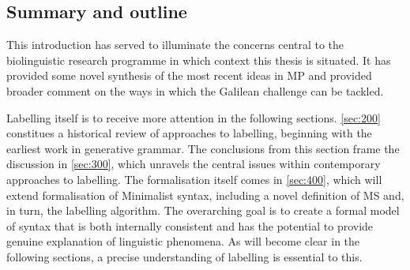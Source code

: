 \subsection{Summary and outline}\label{sec:160}

This introduction has served to illuminate the concerns central to the biolinguistic research programme in which context this thesis is situated. It has provided some novel synthesis of the most recent ideas in MP and provided broader comment on the ways in which the Galilean challenge can be tackled.

Labelling itself is to receive more attention in the following sections. \autoref{sec:200} constitues a historical review of approaches to labelling, beginning with the earliest work in generative grammar. The conclusions from this section frame the discussion in \autoref{sec:300}, which unravels the central issues within contemporary approaches to labelling. The formalisation itself comes in \autoref{sec:400}, which will extend  formalisation of Minimalist syntax, including a novel definition of MS and, in turn, the labelling algorithm. The overarching goal is to create a formal model of syntax that is both internally consistent and has the potential to provide genuine explanation of linguistic phenomena. As will become clear in the following sections, a precise understanding of labelling is essential to this.
